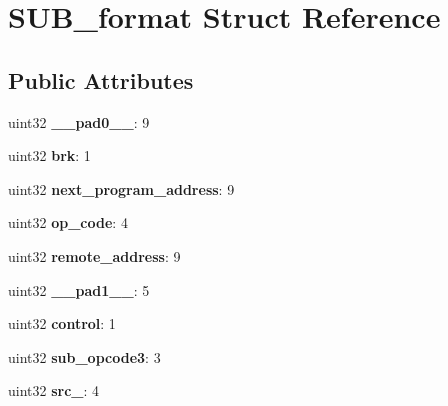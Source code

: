 \hypertarget{structSUB__format}{}\section{S\+U\+B\+\_\+format Struct Reference}
\label{structSUB__format}
\subsection*{Public Attributes}
\begin{DoxyCompactItemize}
\item 
\mbox{\label{structSUB__format_af929c571748d27d6ec9bab3908f68b6f}} 
uint32 {\bfseries \+\_\+\+\_\+pad0\+\_\+\+\_\+}\+: 9
\item 
\mbox{\label{structSUB__format_a2669fe1686592f6ab19347dd332a0ee5}} 
uint32 {\bfseries brk}\+: 1
\item 
\mbox{\label{structSUB__format_ab524ab856b15c2df47c2d91a8c653586}} 
uint32 {\bfseries next\+\_\+program\+\_\+address}\+: 9
\item 
\mbox{\label{structSUB__format_ab996e33f7bd39335b789b808ce3140cd}} 
uint32 {\bfseries op\+\_\+code}\+: 4
\item 
\mbox{\label{structSUB__format_a7723b32008e2a40e359e06f6f0af17b5}} 
uint32 {\bfseries remote\+\_\+address}\+: 9
\item 
\mbox{\label{structSUB__format_aedb2ab620cd5bd5ec58e638860a43c0c}} 
uint32 {\bfseries \+\_\+\+\_\+pad1\+\_\+\+\_\+}\+: 5
\item 
\mbox{\label{structSUB__format_a5ab5d6c16c1a950e3948f57d25f98575}} 
uint32 {\bfseries control}\+: 1
\item 
\mbox{\label{structSUB__format_a74e8cb52049c49a2ef3fbef15733c2cc}} 
uint32 {\bfseries sub\+\_\+opcode3}\+: 3
\item 
\mbox{\label{structSUB__format_ab42a7de350f78346ad21b71a7feb7c8d}} 
uint32 {\bfseries src\+\_}\+: 4
\item 

\end{DoxyCompactItemize}
